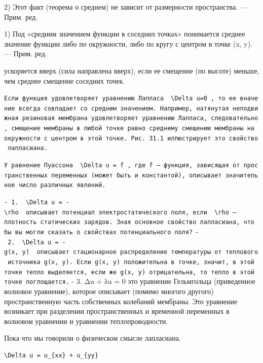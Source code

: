 \documentclass[
  ukrainian,
]{article}
\begin{document}
2) Этот факт (теорема о среднем) не зависит от размерности пространства.
--- Прим. ред.

1) Под «средним значением функции в соседних точках» понимается среднее
значение функции либо по окружности, либо по кругу с центром в точке (x,
y). --- Прим. ред.

ускоряется вверх (сила направлена вверх), если ее смещение (по высоте)
меньше, чем среднее смещение соседних точек.

\texttt{Если\ функция\ удовлетворяет\ уравнению\ Лапласа\ \ \textquotesingle{}\textbackslash{}Delta\ u=0\textquotesingle{}\ ,\ то\ ее\ вначение\ всегда\ совпадает\ со\ средним\ значением.\ Например,\ натянутая\ неподвижная\ резиновая\ мембрана\ удовлетворяет\ уравнению\ Лапласа,\ следовательно,\ смещение\ мембраны\ в\ любой\ точке\ равно\ среднему\ смещению\ мембраны\ на\ окружности\ с\ центром\ в\ этой\ точке.\ Рис.\ 31.1\ иллюстрирует\ это\ свойство\ лапласиана.}

\texttt{У\ равнение\ Пуассона\ \ \textquotesingle{}\textbackslash{}Delta\ u\ =\ f\textquotesingle{}\ ,\ где\ f\ —\ функция,\ зависящая\ от\ пространственных\ переменных\ (может\ быть\ и\ константой),\ описывает\ значительное\ число\ различных\ явлений.}

\texttt{-\ 1.\ \ \textquotesingle{}\textbackslash{}Delta\ u\ =\ -\textbackslash{}rho\textquotesingle{}\ \ описывает\ потенциал\ электростатического\ поля,\ если\ \ \textquotesingle{}\textbackslash{}rho\textquotesingle{}\ —плотность\ статических\ зарядов.\ Зная\ основное\ свойство\ лапласиана,\ что\ бы\ вы\ могли\ сказать\ о\ свойствах\ потенциального\ поля?}
\texttt{-\ 2.\ \ \textquotesingle{}\textbackslash{}Delta\ u\ =\ -g(x,\ y)\textquotesingle{}\ \ описывает\ стационарное\ распределение\ температуры\ от\ теплового\ источника\ \textquotesingle{}g(x,\ y)\textquotesingle{}.\ Если\ \textquotesingle{}g(x,\ y)\textquotesingle{}\ положительна\ в\ точке,\ значит,\ в\ этой\ точке\ тепло\ выделяется,\ если\ же\ \textquotesingle{}g(x,\ y)\textquotesingle{}\ отрицательна,\ то\ тепло\ в\ этой\ точке\ поглощается.}
- 3. Δu + λu = 0 это уравнение Гельмгольца (приведенное волновое
уравнение), которое описывает (помимо многого другого) пространственную
часть собственных колебаний мембраны. Это уравнение возникает при
разделении пространственных и временной переменных в волновом уравнении
и уравнении теплопроводности.

Пока что мы говорили о физическом смысле лапласиана.

\begin{verbatim}
\Delta u = u_{xx} + u_{yy}
\end{verbatim}
\end{document}
